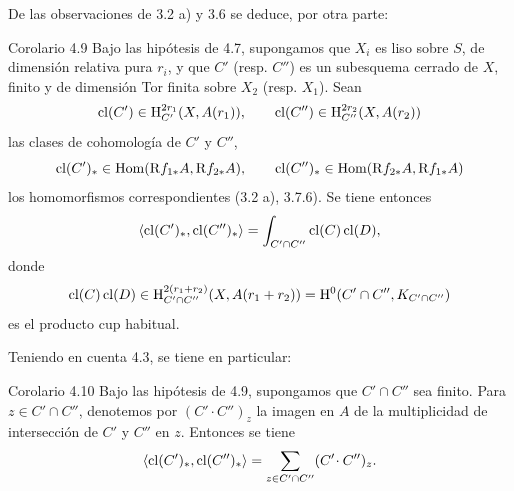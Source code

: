 De las observaciones de 3.2 a) y 3.6 se deduce, por otra parte:

\begin{statement}{Corolario 4.9}
Bajo las hipótesis de 4.7, supongamos que $X_i$ es liso sobre $S$, de dimensión relativa pura $r_i$, y que $C'$ (resp. $C''$) es un subesquema cerrado de $X$, finito y de dimensión Tor finita sobre $X_2$ (resp. $X_1$). Sean
\[
\operatorname{cl}(C')\in \mathrm{H}_{C'}^{2r_1}(X,A(r_1)),\qquad
\operatorname{cl}(C'')\in \mathrm{H}_{C''}^{2r_2}(X,A(r_2))
\]
las clases de cohomología de $C'$ y $C''$,
\[
\operatorname{cl}(C')_*\in\operatorname{Hom}(\mathrm{R} f_{1*}A,\mathrm{R} f_{2*}A),\qquad
\operatorname{cl}(C'')_*\in\operatorname{Hom}(\mathrm{R} f_{2*}A,\mathrm{R} f_{1*}A)
\]
los homomorfismos correspondientes (3.2 a), 3.7.6). Se tiene entonces
\[
\langle \operatorname{cl}(C')_*,\operatorname{cl}(C'')_*\rangle
=
\int_{C'\cap C''}\operatorname{cl}(C)\operatorname{cl}(D),
\]
donde
\[
\operatorname{cl}(C)\operatorname{cl}(D)\in
\mathrm{H}_{C'\cap C''}^{2(r_1+r_2)}(X,A(r_1+r_2))
=
\mathrm{H}^0(C'\cap C'',K_{C'\cap C''})
\]
es el producto cup habitual.
\end{statement}

Teniendo en cuenta 4.3, se tiene en particular:

\begin{statement}{Corolario 4.10}
Bajo las hipótesis de 4.9, supongamos que $C'\cap C''$ sea finito. Para $z\in C'\cap C''$, denotemos por $(C'\!\cdot C'')_z$ la imagen en $A$ de la multiplicidad de intersección de $C'$ y $C''$ en $z$. Entonces se tiene
\[
\langle \operatorname{cl}(C')_*,\operatorname{cl}(C'')_*\rangle
=
\sum_{z\in C'\cap C''}(C'\!\cdot C'')_z.
\]
\end{statement}

